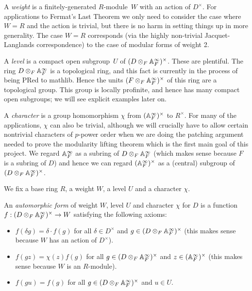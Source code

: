 A \emph{weight} is a finitely-generated $R$-module~$W$ with an action of $D^\times$. For applications
to Fermat's Last Theorem we only need to consider the case where $W=R$ and the action is trivial,
but there is no harm in setting things up in more generality. The case $W=R$ corresponds (via
the highly non-trivial Jacquet-Langlands correspondence) to the case of modular forms of weight 2.

A \emph{level} is a compact open subgroup~$U$ of $(D\otimes_F\mathbb{A}_F^\infty)^\times$. These are plentiful.
The ring $D\otimes_F\mathbb{A}_F^\infty$ is a topological ring, and this fact is currently in the process
of being PRed to mathlib. Hence the units $(F\otimes_F\mathbb{A}_F^\infty)^\times$ of this ring are a topological
group. This group is locally profinite, and hence has many compact open subgroups; we will see
explicit examples later on.

A \emph{character} is a group homomorphism $\chi$ from $(\mathbb{A}_F^\infty)^\times$ to $R^\times$. For many
of the applications, $\chi$ can also be trivial, although we will crucially have to allow
certain nontrivial characters of $p$-power order when we are doing the patching argument needed
to prove the modularity lifting theorem which is the first main goal of this project.
We regard $\mathbb{A}_F^\infty$ as a subring of $D\otimes_F\mathbb{A}_F^\infty$ (which makes sense because
$F$ is a subring of $D$) and hence we can regard $(\mathbb{A}_F^\infty)^\times$ as a (central)
subgroup of $(D\otimes_F\mathbb{A}_F^\infty)^\times$.

We fix a base ring $R$, a weight $W$, a level $U$ and a character $\chi$.

\begin{definition}
  \label{TotallyDefiniteQuaternionAlgebra.AutomorphicForm}
  \leanok
  An \emph{automorphic form} of weight $W$, level $U$ and character $\chi$ for $D$ is
  a function $f:(D\otimes_F\mathbb{A}_F^\infty)^\times\to W$ satisfying the following axioms:
  \begin{itemize}
    \item $f(\delta g)=\delta\cdot f(g)$ for all $\delta\in D^\times$ and $g\in (D\otimes_F\mathbb{A}_F^\infty)^\times$
    (this makes sense because $W$ has an action of $D^\times$).
    \item $f(gz)=\chi(z)f(g)$ for all $g\in (D\otimes_F\mathbb{A}_F^\infty)^\times$ and $z\in(\mathbb{A}_F^\infty)^\times$
    (this makes sense because $W$ is an $R$-module).
    \item $f(gu)=f(g)$ for all $g\in (D\otimes_F\mathbb{A}_F^\infty)^\times$ and $u\in U$.
  \end{itemize}
\end{definition}

